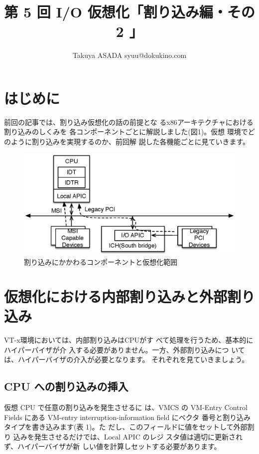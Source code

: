 
\title{第 5 回 I/O 仮想化「割り込み編・その 2 」}
\author{Takuya ASADA syuu@dokukino.com}

\maketitle


\section{はじめに}

 前回の記事では、割り込み仮想化の話の前提とな
るx86アーキテクチャにおける割り込みのしくみを
各コンポーネントごとに解説しました(図1)。仮想
環境でどのように割り込みを実現するのか、前回解
説した各機能ごとに見ていきます。


\begin{figure}\centering
\includegraphics{figures/part5_fig1_interrupt_components.eps}
\caption{割り込みにかかわるコンポーネントと仮想化範囲}
\label{fig1}
\end{figure}


\section{仮想化における内部割り込みと外部割り込み}

 VT-x環境においては、内部割り込みはCPUがす
べて処理を行うため、基本的にハイパーバイザが介
入する必要がありません。一方、外部割り込みにつ
いては、ハイパーバイザの介入が必要となります。
それぞれを見ていきましょう。

\subsection*{CPU への割り込みの挿入}

 仮想 CPU で任意の割り込みを発生させるに
は、VMCS の VM-Entry Control Fields にある
VM-entry interruption-information field にベクタ
番号と割り込みタイプを書き込みます(表 1)。た
だし、このフィールドに値をセットして外部割り
込みを発生させるだけでは、Local APIC のレジ
スタ値は適切に更新されず、ハイパーバイザが新
しい値を計算しセットする必要があります。


